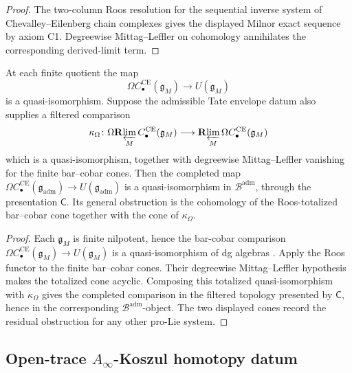 \begin{proof}
The two-column Roos resolution for the sequential inverse system of
Chevalley--Eilenberg chain complexes gives the displayed Milnor exact
sequence by axiom C1.  Degreewise Mittag--Leffler on cohomology
annihilates the corresponding derived-limit term.
\end{proof}

\begin{thm}
\label{thm:completion-tate-bar-cobar}
At each finite quotient the map
\[
\Omega C^{\mathrm{CE}}_\bullet(\mathfrak g_M)\to U(\mathfrak g_M)
\]
is a quasi-isomorphism.  Suppose the admissible Tate envelope datum
also supplies a filtered comparison
\[
  \kappa_\Omega\colon
  \Omega\mathbf R\!\varprojlim_M
    C^{\mathrm{CE}}_\bullet(\mathfrak g_M)
  \longrightarrow
  \mathbf R\!\varprojlim_M
    \Omega C^{\mathrm{CE}}_\bullet(\mathfrak g_M)
\]
which is a quasi-isomorphism, together with degreewise
Mittag--Leffler vanishing for the finite bar--cobar cones.  Then the
completed map
\(\Omega C^{\mathrm{CE}}_\bullet(\mathfrak g_{\mathrm{adm}})\to
U(\mathfrak g_{\mathrm{adm}})\) is a quasi-isomorphism in
\(\mathcal B^{\mathrm{adm}}\), through the presentation \(\mathsf C\).
Its general obstruction is the cohomology of the Roos-totalized
bar--cobar cone together with the cone of \(\kappa_\Omega\).
\end{thm}

\begin{proof}
Each \(\mathfrak g_M\) is finite nilpotent, hence the bar-cobar
comparison \(\Omega C^{\mathrm{CE}}_\bullet(\mathfrak g_M)\to
U(\mathfrak g_M)\) is a quasi-isomorphism of dg algebras
\cite{quillen-htpy}\cite{kontsevich-dq}.
Apply the Roos functor to the finite bar--cobar cones.  Their
degreewise Mittag--Leffler hypothesis makes the totalized cone
acyclic.  Composing this totalized quasi-isomorphism with
\(\kappa_\Omega\) gives the completed comparison in the filtered
topology presented by \(\mathsf C\), hence in the corresponding
\(\mathcal B^{\mathrm{adm}}\)-object.  The two displayed cones record
the residual obstruction for any other pro-Lie system.
\end{proof}

\subsection{\texorpdfstring{Open-trace \(A_\infty\)-Koszul homotopy datum}{Open-trace A--Koszul homotopy datum}}
\label{ssec:completion-ainfty-koszul}

